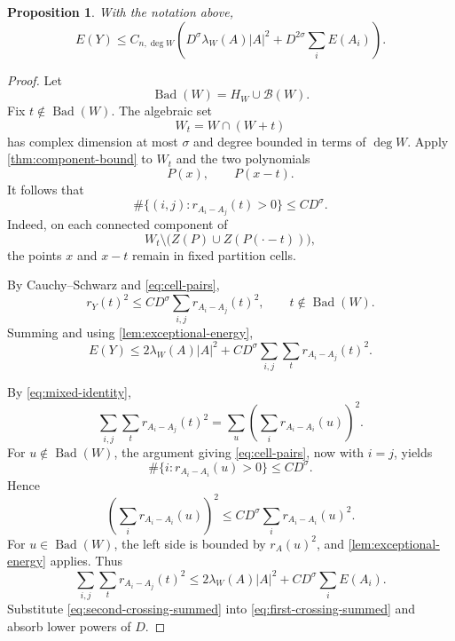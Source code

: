 \documentclass[11pt]{amsart}
\numberwithin{equation}{section}
\newtheorem{proposition}[theorem]{Proposition}
\theoremstyle{definition}
\theoremstyle{remark}
\newcommand{\cB}{\mathcal B}
\newcommand{\Bad}{\operatorname{Bad}}
\newcommand{\1}{\mathbf 1}
\newcommand{\card}[1]{\lvert #1\rvert}
\begin{document}
\begin{proposition}\label{prop:two-crossing}
With the notation above,
\begin{equation}\label{eq:two-crossing}
 E(Y)
 \leq C_{n,\deg W}\left(
 D^\sigma\lambda_W(A)\card A^2
 +D^{2\sigma}\sum_iE(A_i)
 \right).
\end{equation}
\end{proposition}

\begin{proof}
Let
\[
 \Bad(W)=H_W\cup\cB(W).
\]
Fix $t\notin\Bad(W)$.  The algebraic set
\[
 W_t=W\cap(W+t)
\]
has complex dimension at most $\sigma$ and degree bounded in terms of $\deg W$.  Apply \cref{thm:component-bound} to $W_t$ and the two polynomials
\[
 P(x),\qquad P(x-t).
\]
It follows that
\begin{equation}\label{eq:cell-pairs}
 \#\{(i,j):r_{A_i-A_j}(t)>0\}
 \leq C D^\sigma.
\end{equation}
Indeed, on each connected component of
\[
 W_t\setminus\bigl(Z(P)\cup Z(P(\cdot-t))\bigr),
\]
the points $x$ and $x-t$ remain in fixed partition cells.

By Cauchy--Schwarz and \eqref{eq:cell-pairs},
\begin{equation}\label{eq:first-crossing}
 r_Y(t)^2
 \leq C D^\sigma\sum_{i,j}r_{A_i-A_j}(t)^2,
 \qquad t\notin\Bad(W).
\end{equation}
Summing and using \cref{lem:exceptional-energy},
\begin{equation}\label{eq:first-crossing-summed}
 E(Y)
 \leq 2\lambda_W(A)\card A^2
 +CD^\sigma\sum_{i,j}\sum_t r_{A_i-A_j}(t)^2.
\end{equation}

By \eqref{eq:mixed-identity},
\begin{equation}\label{eq:crossing-rearrange}
 \sum_{i,j}\sum_t r_{A_i-A_j}(t)^2
 =\sum_u\left(\sum_i r_{A_i-A_i}(u)\right)^2.
\end{equation}
For $u\notin\Bad(W)$, the argument giving \eqref{eq:cell-pairs}, now with $i=j$, yields
\[
 \#\{i:r_{A_i-A_i}(u)>0\}\leq CD^\sigma.
\]
Hence
\begin{equation}\label{eq:second-crossing-good}
 \left(\sum_i r_{A_i-A_i}(u)\right)^2
 \leq CD^\sigma\sum_i r_{A_i-A_i}(u)^2.
\end{equation}
For $u\in\Bad(W)$, the left side is bounded by $r_A(u)^2$, and \cref{lem:exceptional-energy} applies.  Thus
\begin{equation}\label{eq:second-crossing-summed}
 \sum_{i,j}\sum_t r_{A_i-A_j}(t)^2
 \leq 2\lambda_W(A)\card A^2
 +CD^\sigma\sum_iE(A_i).
\end{equation}
Substitute \eqref{eq:second-crossing-summed} into \eqref{eq:first-crossing-summed} and absorb lower powers of $D$.
\end{proof}
\end{document}

